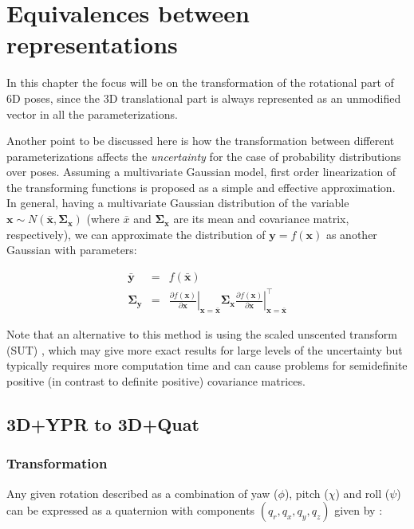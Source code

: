 \documentclass[a4paper,11pt]{report}
\begin{document}
\chapter{Equivalences between representations}

In this chapter the focus will be on the transformation of the rotational 
part of 6D poses, since the 3D translational part is always represented as an 
unmodified vector in all the parameterizations.

Another point to be discussed here is how the transformation between different 
parameterizations affects the \emph{uncertainty} for the case of probability distributions over poses. 
Assuming a multivariate Gaussian model, first order 
linearization of the transforming functions
is proposed as a simple and effective approximation. 
In general, having a multivariate Gaussian distribution of the variable 
$\mathbf{x} \sim N(\bar{\mathbf{x}},\mathbf{\Sigma_x})$ (where $\bar{x}$ and $\mathbf{\Sigma_x}$ 
are its mean and covariance matrix, respectively), we can approximate 
the distribution of $\mathbf{y} = f(\mathbf{x})$ as another Gaussian 
with parameters:

\begin{eqnarray}
 \bar{\mathbf{y}} &=& f(\bar{\mathbf{x}}) \\
 \mathbf{\Sigma_y} &=& 
\left.\frac{\partial f(\mathbf{x})}{\partial \mathbf{x}}\right|_{\mathbf{x}=\bar{\mathbf{x}}}
\mathbf{\Sigma_x}
\left.\frac{\partial f(\mathbf{x})}{\partial \mathbf{x}}\right|_{\mathbf{x}=\bar{\mathbf{x}}}^\top
\end{eqnarray}



Note that an alternative to this method is using the scaled unscented 
transform (SUT) \cite{julier2002sut}, which may give more exact results for 
large levels of the uncertainty but typically requires more computation time 
and can cause problems for semidefinite positive (in contrast to definite positive) 
covariance matrices.

\section{3D+YPR to 3D+Quat }
\label{sect:ypr2quat}

\subsection{Transformation}

Any given rotation described as a combination of yaw ($\phi$),
pitch ($\chi$) and roll ($\psi$) can
be expressed as a quaternion with components $(q_r, q_x,q_y,q_z)$ 
given by \cite{horn2001some}:
\end{document}
